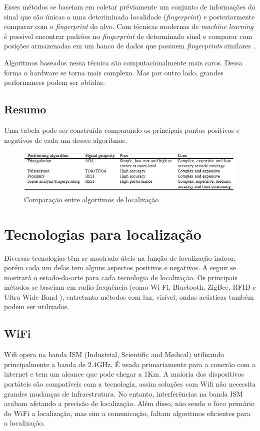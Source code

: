 Esses métodos se baseiam em coletar préviamente um conjunto de informações do sinal que são únicas a uma deteriminada localidade (\textit{fingerprint}) e posteriormente comparar com o \textit{fingerprint} do alvo. Com técnicas modernas de \textit{machine learning} é possivel encontrar padrões no \textit{fingerprint} de determinado sinal e comparar com posições armazenadas em um banco de dados que possuem \textit{fingerprints} similares \cite{art13}.

Algoritmos baseados nessa técnica são computacionalmente mais caros. Dessa forma o hardware se torna mais complexo. Mas por outro lado, grandes performances podem ser obtidas.

\subsection{Resumo}

Uma tabela pode ser construída comparando os principais pontos positivos e negativos de cada um desses algoritmos.
\begin{figure}[H]
	\centering
	\includegraphics[scale = 1]{images/algorithms_table.png}
	\caption{Comparação entre algoritmos de localização \cite{art1}}
	\label{fig:algorithms_table.png}
\end{figure}

\section{Tecnologias para localização}
Diversas tecnologias têm-se mostrado úteis na função de localização indoor, porém cada um delas tem alguns aspectos positivos e negativos. A seguir se mostrará o estado-da-arte para cada tecnologia de localização. Os principais métodos se baseiam em radio-frequência (como Wi-Fi, Bluetooth, ZigBee, RFID e Ultra Wide Band ), entretanto métodos com luz, visível, ondas acústicas também podem ser utilizados.

\subsection{WiFi}
Wifi opera na banda ISM (Industrial, Scientific and Medical) utilizando principalmente a banda de 2.4GHz. É usada primariamente para a conexão com a internet e tem um alcance que pode chegar a 1Km. A maioria dos dispositivos portáteis são compatíveis com a tecnologia, assim soluções com Wifi não necessita grandes mudanças de infraestrutura. No entanto, interferências na banda ISM acabam afetando a precisão de localização. Além disso, não sendo o foco primário do WiFi a localização, mas sim a comunicação, faltam algoritmos eficientes para a localização.

